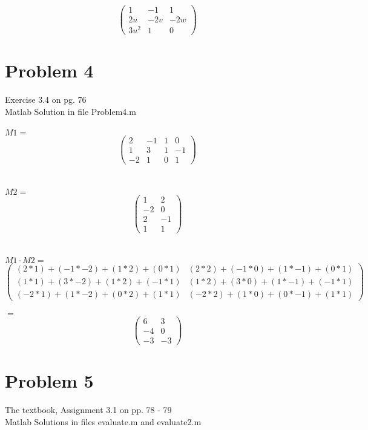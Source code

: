 \documentclass[12pt]{article}
\begin{document}
\[ \left( \begin{array}{ccc}
1 & -1 & 1 \\
2u & -2v & -2w \\
3u^2 & 1 & 0 \end{array} \right)\] 


\section{Problem 4}
Exercise 3.4 on pg. 76\\
Matlab Solution in file Problem4.m\\ \\


$M1 = $
\[ \left( \begin{array}{cccc}
2 & -1 & 1 & 0\\
1 & 3 & 1 & -1 \\
-2 & 1 & 0 & 1 \end{array} \right)\] 
\\ \\
$M2 = $
\[ \left( \begin{array}{cc}
1 & 2 \\
-2 & 0 \\
2 & -1 \\
1 & 1 \end{array} \right)\] 
\\ \\
$M1 \cdot M2 = $\\
\[ \left( \begin{array}{cc}
(2*1) + (-1*-2) + (1 * 2) + (0 * 1) & (2*2) + (-1*0) + (1 * -1) + (0 * 1)\\
(1*1) + (3*-2) + (1 * 2) + (-1 * 1) & (1*2) + (3*0) + (1 * -1) + (-1 * 1)\\
(-2*1) + (1*-2) + (0 * 2) + (1 * 1) & (-2*2) + (1*0) + (0 * -1) + (1 * 1)\end{array} \right)\] 
\\
{\Large $=$}
\\
\[ \left( \begin{array}{cc}
6 & 3\\
-4 & 0\\
-3 & -3\end{array} \right)\] 



\section{Problem 5}	
The textbook, Assignment 3.1 on pp. 78 - 79\\
Matlab Solutions in files evaluate.m and evaluate2.m\\
\end{document}

